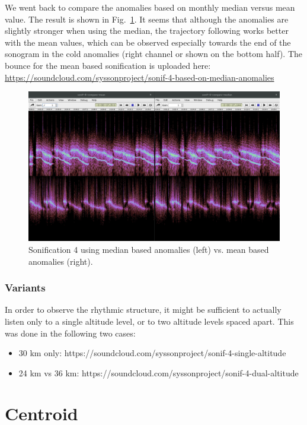 \documentclass[11pt,a4paper]{article}
\newcommand{\figref}[1]{Fig.~\ref{#1}}
\begin{document}
We went back to compare the anomalies based on monthly median versus mean value. The result is shown in \figref{fig:sonif4-compare-median-mean}. It seems that although the anomalies are slightly stronger when using the median, the trajectory following works better with the mean values, which can be observed especially towards the end of the sonogram in the cold anomalies (right channel or shown on the bottom half). The bounce for the mean based sonification is uploaded here: \url{https://soundcloud.com/syssonproject/sonif-4-based-on-median-anomalies}

\begin{figure}
\includegraphics[width=\textwidth]{figures/sonif4-compare-median-mean.jpg}
\caption{Sonification 4 using median based anomalies (left) vs. mean based anomalies (right).}
\label{fig:sonif4-compare-median-mean}
\end{figure}

\subsubsection*{Variants}

In order to observe the rhythmic structure, it might be sufficient to actually listen only to a single altitude level, or to two altitude levels spaced apart. This was done in the following two cases:
%
\begin{itemize}
\item 30 km only: https://soundcloud.com/syssonproject/sonif-4-single-altitude
\item 24 km vs 36 km: https://soundcloud.com/syssonproject/sonif-4-dual-altitude
\end{itemize}
%

\section{Centroid}
\end{document}
